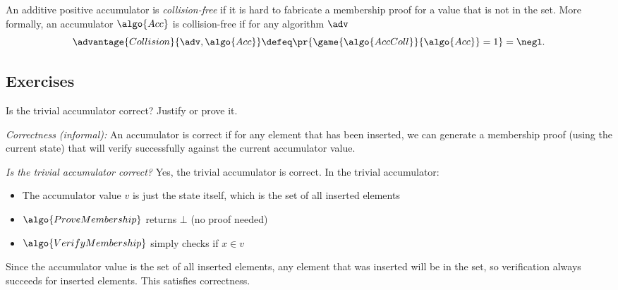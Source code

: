 \begin{definition}
    An additive positive accumulator is \emph{collision-free} if it is hard to fabricate a membership proof for a value that is not in the set.
    More formally, an accumulator $\algo{Acc}$ is collision-free if for any \ppt algorithm $\adv$
    \[
      \advantage{Collision}{\adv, \algo{Acc}} \defeq \pr{\game{\algo{AccColl}}{\algo{Acc}} = 1} = \negl.
    \]
\end{definition}

\subsection{Exercises}

\begin{exercise}
  Is the trivial accumulator correct?
  Justify or prove it.
\end{exercise}

\ifsolutions
\begin{mysolution}
  \emph{Correctness (informal):} An accumulator is correct if for any element that has been inserted, we can generate a membership proof (using the current state) that will verify successfully against the current accumulator value.
  
  \emph{Is the trivial accumulator correct?} Yes, the trivial accumulator is correct.
  In the trivial accumulator:
  \begin{itemize}
    \item The accumulator value $v$ is just the state itself, which is the set of all inserted elements
    \item $\algo{ProveMembership}$ returns $\bot$ (no proof needed)
    \item $\algo{VerifyMembership}$ simply checks if $x \in v$
  \end{itemize}
  
  Since the accumulator value is the set of all inserted elements, any element that was inserted will be in the set, so verification always succeeds for inserted elements.
  This satisfies correctness.
\end{mysolution}
\fi

